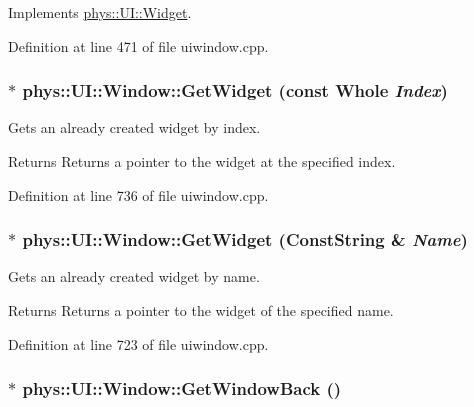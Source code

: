 Implements \hyperlink{classphys_1_1UI_1_1Widget_a07039c19e57de314147ce066417da0a2}{phys::UI::Widget}.



Definition at line 471 of file uiwindow.cpp.

\hypertarget{classphys_1_1UI_1_1Window_aaae8adbb33e9bd13aca4eec49ec978c9}{
\subsubsection[{GetWidget}]{ $\ast$ phys::UI::Window::GetWidget (const {\bf Whole} {\em Index})}}
\label{d4/d86/classphys_1_1UI_1_1Window_aaae8adbb33e9bd13aca4eec49ec978c9}


Gets an already created widget by index. 

\begin{DoxyReturn}{Returns}
Returns a pointer to the widget at the specified index. 
\end{DoxyReturn}


Definition at line 736 of file uiwindow.cpp.

\hypertarget{classphys_1_1UI_1_1Window_a0d2274afdabda9915d242dc3d057ae61}{
\subsubsection[{GetWidget}]{ $\ast$ phys::UI::Window::GetWidget ({\bf ConstString} \& {\em Name})}}
\label{d4/d86/classphys_1_1UI_1_1Window_a0d2274afdabda9915d242dc3d057ae61}


Gets an already created widget by name. 

\begin{DoxyReturn}{Returns}
Returns a pointer to the widget of the specified name. 
\end{DoxyReturn}


Definition at line 723 of file uiwindow.cpp.

\hypertarget{classphys_1_1UI_1_1Window_af06ae5666145e4d8835b38f4a9cbca2a}{
\subsubsection[{GetWindowBack}]{ $\ast$ phys::UI::Window::GetWindowBack ()}}
\label{d4/d86/classphys_1_1UI_1_1Window_af06ae5666145e4d8835b38f4a9cbca2a}


